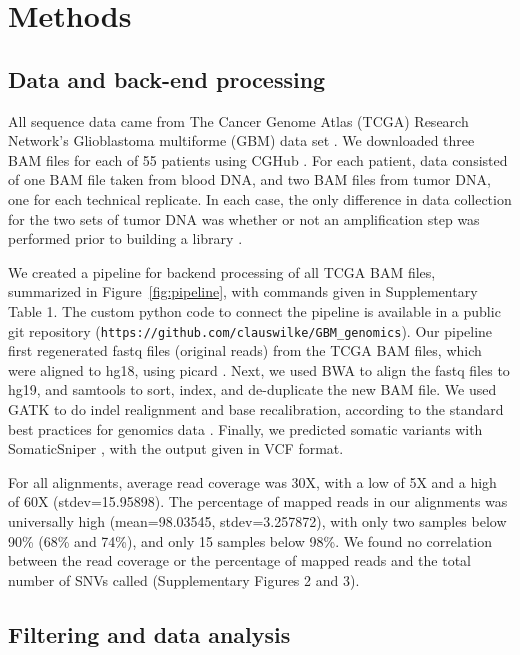 \documentclass[11 pt]{article} %
\begin{document}
\section*{Methods}

\subsection*{Data and back-end processing}

All sequence data came from The Cancer Genome Atlas (TCGA) Research Network's Glioblastoma multiforme (GBM) data set \citep{TCGA-GBM}. We downloaded three BAM files for each of 55 patients using CGHub \citep{CGHub}. For each patient, data consisted of one BAM file taken from blood DNA, and two BAM files from tumor DNA, one for each technical replicate. In each case, the only difference in data collection for the two sets of tumor DNA was whether or not an amplification step was performed prior to building a library \citep{TCGA-GBM}. 

We created a pipeline for backend processing of all TCGA BAM files, summarized in Figure~\ref{fig:pipeline}, with commands given in Supplementary Table 1. The custom python code to connect the pipeline is available in a public git repository (\texttt{https://github.com/clauswilke/GBM\_genomics}). Our pipeline first regenerated fastq files (original reads) from the TCGA BAM files, which were aligned to hg18, using picard \citep{picard}. Next, we used BWA \citep{bwa} to align the fastq files to hg19, and samtools \citep{SAMtools} to sort, index, and de-duplicate the new BAM file. We used GATK \citep{GATK} to do indel realignment and base recalibration, according to the standard best practices for genomics data \citep{best-practices}. Finally, we predicted somatic variants with SomaticSniper \citep{SomaticSniper}, with the output given in VCF format.

For all alignments, average read coverage was 30X, with a low of 5X and a high of 60X (stdev=15.95898). The percentage of mapped reads in our alignments was universally high (mean=98.03545, stdev=3.257872), with only two samples below 90\% (68\% and 74\%), and only 15 samples below 98\%. We found no correlation between the read coverage or the percentage of mapped reads and the total number of SNVs called (Supplementary Figures 2 and 3).

\subsection*{Filtering and data analysis}
\end{document}
